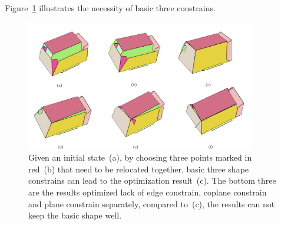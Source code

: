 Figure~\ref{fig:constrain} illustrates the necessity of basic three constrains.

\begin{figure}
	\centering
	\includegraphics[width=0.9\textwidth]{images/constrain.jpg}
	\caption{Given an initial state~(a), by choosing three points marked in red~(b) that need to be relocated together, basic three shape constrains can lead to the optimization result~(c). The bottom three are the results optimized lack of edge constrain, coplane constrain and plane constrain separately, compared to~(c), the results can not keep the basic shape well.}
	\label{fig:constrain}
\end{figure}

